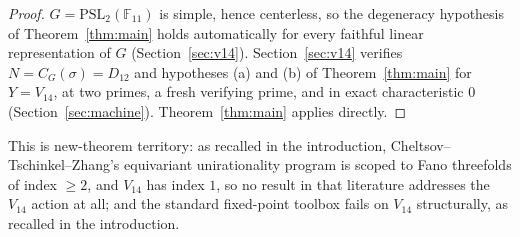 \documentclass[11pt]{article}
\theoremstyle{plain}
\theoremstyle{definition}
\theoremstyle{remark}
\newcommand{\PSL}{\mathrm{PSL}_2(\mathbb{F}_{11})}
\begin{document}
\begin{proof}
$G=\PSL$ is simple, hence centerless, so the degeneracy hypothesis of
Theorem~\ref{thm:main} holds automatically for every faithful linear
representation of $G$ (Section~\ref{sec:v14}). Section~\ref{sec:v14}
verifies $N=C_G(\sigma)=D_{12}$ and hypotheses (a) and (b) of
Theorem~\ref{thm:main} for $Y=V_{14}$, at two primes, a fresh verifying
prime, and in exact characteristic $0$ (Section~\ref{sec:machine}).
Theorem~\ref{thm:main} applies directly.
\end{proof}

This is new-theorem territory: as recalled in the introduction,
Cheltsov--Tschinkel--Zhang's equivariant unirationality program is
scoped to Fano threefolds of index $\ge 2$, and $V_{14}$ has index $1$,
so no result in that literature addresses the $V_{14}$ action at all;
and the standard fixed-point toolbox fails on $V_{14}$ structurally, as
recalled in the introduction.
\end{document}
